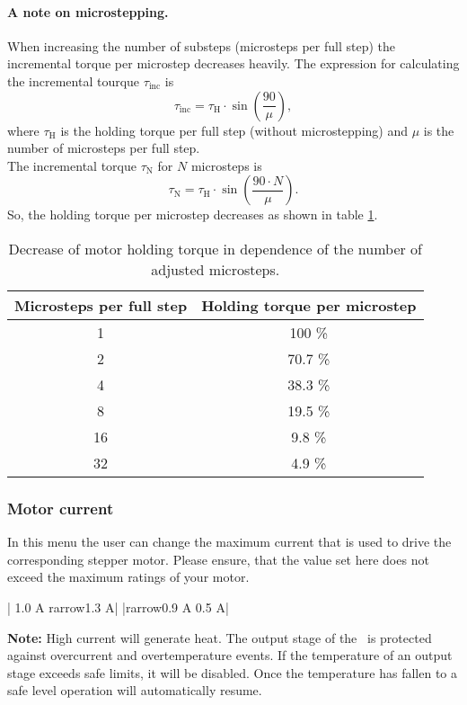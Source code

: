 \paragraph{A note on microstepping.}
When increasing the number of substeps (microsteps per full step) the incremental torque per microstep decreases heavily. The expression for calculating the incremental tourque $\tau_{\text{inc}}$ is
\begin{equation*}
  \tau_{\text{inc}} = \tau_{\text{H}} \cdot \sin \left( \frac{90}{\mu} \right),
\end{equation*}
where $\tau_{\text{H}}$ is the holding torque per full step (without microstepping) and $\mu$ is the number of microsteps per full step.\\
The incremental torque $\tau_{\text{N}}$ for $N$ microsteps is
\begin{equation*}
  \tau_{\text{N}} = \tau_{\text{H}} \cdot \sin \left( \frac{90\cdot N}{\mu} \right).
\end{equation*}
So, the holding torque per microstep decreases as shown in table \ref{tab:microstepping_holding_torque}.
\begin{table}[h]
  \caption[Holding torque vs. number of microsteps]{Decrease of motor holding torque in dependence of the number of adjusted microsteps.}
  \label{tab:microstepping_holding_torque}
  \centering
  \begin{tabular}{cc}
    \toprule
    \textbf{Microsteps per full step} & \textbf{Holding torque per microstep} \\
    \toprule
    1 & 100 \% \\ \midrule
    2 & 70.7 \%\\ \midrule
    4 & 38.3 \% \\ \midrule
    8 & 19.5 \% \\ \midrule
    16 & 9.8 \% \\ \midrule
    32 & 4.9 \% \\
    \bottomrule
  \end{tabular}
\end{table}

\subsubsection{Motor current}
\label{menu_motor_current}
In this menu the user can change the maximum current that is used to drive the corresponding stepper motor. Please ensure, that the value set here does not exceed the maximum ratings of your motor.\\
\begin{center}
  | 1.0 A  {rarrow}1.3 A|
             |{rarrow}0.9 A   0.5 A|
\end{center}
\textbf{Note:} High current will generate heat. The output stage of the \productName ~is protected against overcurrent and overtemperature events. If the temperature of an output stage exceeds safe limits, it will be disabled. Once the temperature has fallen to a safe level operation will automatically resume.


